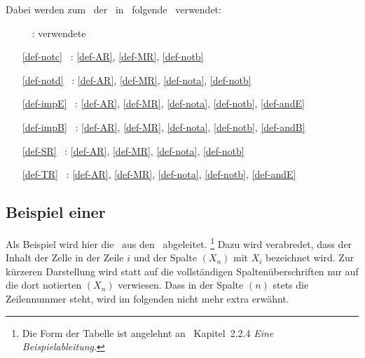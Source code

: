 {Dabei werden zum \Beweis\ der \Schlussregeln\ in~\cite{bib:Rautenberg} folgende \Basisregeln\ verwendet:
\begin{itemize}
	\renewcommand*{\itemindent}{3cm}
	\renewcommand*{\labelsep}{5pt}
	\item[\Schlussregel\ ~:] verwendete \Basisregeln
	\item[\ref{def-notc} ~:] \ref{def-AR}, \ref{def-MR}, \ref{def-notb}
	\item[\ref{def-notd} ~:] \ref{def-AR}, \ref{def-MR}, \ref{def-nota}, \ref{def-notb}
	\item[\ref{def-impE} ~:] \ref{def-AR}, \ref{def-MR}, \ref{def-nota}, \ref{def-notb}, \ref{def-andE}
	\item[\ref{def-impB} ~:] \ref{def-AR}, \ref{def-MR}, \ref{def-nota}, \ref{def-notb}, \ref{def-andB}
	\item[\ref{def-SR}   ~:] \ref{def-AR}, \ref{def-MR}, \ref{def-nota}, \ref{def-notb}
	\item[\ref{def-TR}   ~:] \ref{def-AR}, \ref{def-MR}, \ref{def-nota}, \ref{def-notb}, \ref{def-andE}
\end{itemize}
%
\subsection[Beispiel einer Ableitung]{Beispiel einer \Ableitung}%
\label                           {sub-BeispielAbleitung}

Als Beispiel wird hier die \Schnittregel\ aus den \Basisregeln\ abgeleitet.%
\footnote{%
	Die Form der Tabelle ist angelehnt an~\cite{bib:NatuerlichesSchliessen} Kapitel~2.2.4 \emph{Eine Beispielableitung}.
}
Dazu wird verabredet, dass  der Inhalt der Zelle in der Zeile $i$ und der Spalte $(X_n)$ mit $X_i$ bezeichnet wird.
Zur kürzeren Darstellung wird statt auf die vollständigen Spaltenüberschriften nur auf die dort notierten $(X_n)$ verwiesen. Dass in der Spalte $(n)$ stets die Zeilennummer steht, wird im folgenden nicht mehr extra erwähnt.

}
